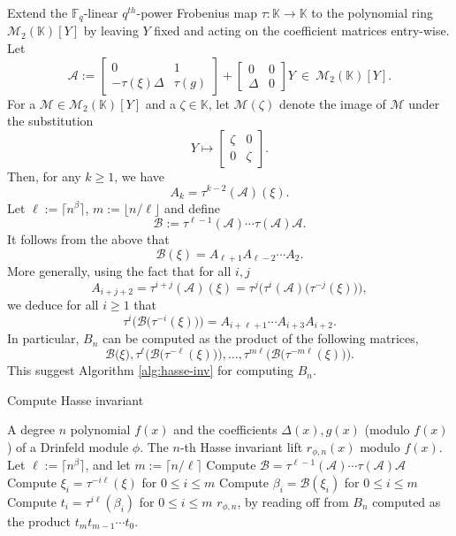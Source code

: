 \documentclass[12pt]{article}
\theoremstyle{plain}
\theoremstyle{definition}
\def\F{\ensuremath{\mathbb{F}}}
\def\K{\ensuremath{\mathbb{K}}}
\begin{document}
Extend the $\F_q$-linear $q^{th}$-power Frobenius map $\tau: \K \to \K$ to the polynomial ring $\mathscr{M}_2(\K)[Y]$ by leaving $Y$ fixed and acting on the coefficient matrices entry-wise.
Let
\[
\mathcal{A} := 
\begin{bmatrix}
0 & 1 \\
-\tau(\xi)\Delta & \tau(g)
\end{bmatrix}
+
\begin{bmatrix}
0 & 0 \\
\Delta & 0
\end{bmatrix} Y ~ \in ~ \mathscr{M}_2(\K)[Y].
\]
For a $\mathcal{M} \in \mathscr{M}_2(\K)[Y]$ and a $\zeta \in \K$, let $\mathcal{M}(\zeta)$ denote the image of $\mathcal{M}$ under the substitution 
\[Y \longmapsto 
\begin{bmatrix}
	\zeta & 0 \\
	0 & \zeta
\end{bmatrix}.
\]
Then, for any $k \ge 1$, we have $$A_k = \tau^{k - 2}(\mathcal{A})(\xi).$$
Let $\ell := \lceil n^\beta \rceil$, $m := \lfloor n / \ell \rfloor$ and define 
\[\mathcal{B} := \tau^{\ell-1}(\mathcal{A}) \cdots \tau(\mathcal{A}) \mathcal{A}.\]
It follows from the above that 
\[\mathcal{B}(\xi) = A_{\ell+1}A_{\ell - 2} \cdots A_2.\]
More generally, using the fact that for all $i, j$
\[A_{i + j + 2} = \tau^{i + j}(\mathcal{A})(\xi) = \tau^j\Big(\tau^i(\mathcal{A})\big( 
\tau^{-j}(\xi)\big)\Big),\]
we deduce for all $i \ge 1$ that 
\[\tau^{i}\Big(\mathcal{B} \big( \tau^{-i}(\xi)\big) \Big) = A_{i + \ell+1} \cdots A_{i + 3}A_{i + 
2}.\]
In particular, $B_n$ can be computed as the product of the following matrices, 
\[
\mathcal{B} \big(\xi\big), \tau^{\ell}\Big(\mathcal{B} \big( \tau^{-\ell}(\xi)\big) \Big), \dots, 
\tau^{m \ell}\Big(\mathcal{B} \big( \tau^{-m \ell}(\xi)\big) \Big).
\]
This suggest Algorithm \ref{alg:hasse-inv} for computing $B_n$.

\begin{algorithm}[H]
	\caption{Compute Hasse invariant}
	\label{alg:hasse-inv}
	\begin{algorithmic}[1]
		\REQUIRE A degree $n$ polynomial $f(x)$ and the coefficients $\Delta(x), g(x)$ (modulo $f(x)$) of a Drinfeld module $\phi$.
		\ENSURE The $n$-th Hasse invariant lift $r_{\phi,n}(x)$ modulo $f(x)$.
		\STATE Let $\ell := \lceil n^\beta \rceil$, and let $m := \lceil n / \ell \rceil$
		\STATE\label{step:hasse-2}
		Compute $\mathcal{B} = \tau^{\ell-1}(\mathcal{A}) \cdots \tau(\mathcal{A}) \mathcal{A}$
		\STATE\label{step:hasse-3}
		Compute $\xi_i = \tau^{-i\ell}(\xi)$ for $0 \le i \le m$
		\STATE\label{step:hasse-4}
		Compute $\beta_i = \mathcal{B}(\xi_i)$ for $0 \le i \le m$
		\STATE\label{step:hasse-5}
		Compute $t_i = \tau^{i\ell}(\beta_i)$ for $0 \le i \le m$
		\RETURN\label{step:hasse-6} 
		$r_{\phi,n}$, by reading off from $B_n$ computed as the product $t_m t_{m - 1} \cdots t_0$.
	\end{algorithmic}
\end{algorithm}
\end{document}
